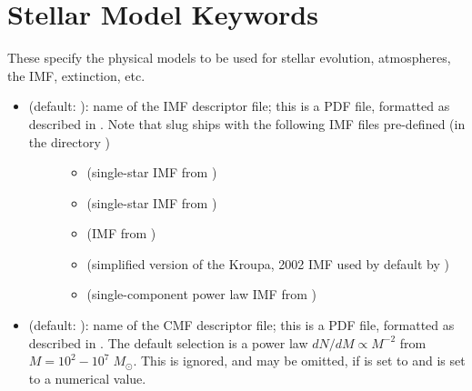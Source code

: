 \documentclass[letterpaper,10pt,english]{sphinxmanual}
\begin{document}
\section{Stellar Model Keywords}
\label{\detokenize{parameters:stellar-model-keywords}}\label{\detokenize{parameters:ssec-stellar-keywords}}
These specify the physical models to be used for stellar evolution, atmospheres, the IMF, extinction, etc.
\begin{itemize}
\item {} \begin{description}
\item[{ (default: ): name of the IMF descriptor file; this is a PDF file, formatted as described in {\hyperref[\detokenize{pdfs:sec-pdfs}]{}}. Note that slug ships with the following IMF files pre-defined (in the directory )}] \leavevmode\begin{itemize}
\item {} 
 (single-star IMF from )

\item {} 
 (single-star IMF from )

\item {} 
 (IMF from )

\item {} 
 (simplified version of the Kroupa, 2002 IMF used by default by )

\item {} 
 (single-component power law IMF from )

\end{itemize}

\end{description}

\item {} 
 (default: ): name of the CMF descriptor file; this is a PDF file, formatted as described in {\hyperref[\detokenize{pdfs:sec-pdfs}]{}}. The default selection is a power law \(dN/dM \propto M^{-2}\) from \(M = 10^2 - 10^7\;M_\odot\). This is ignored, and may be omitted, if  is set to  and  is set to a numerical value.


\end{itemize}
\end{document}
